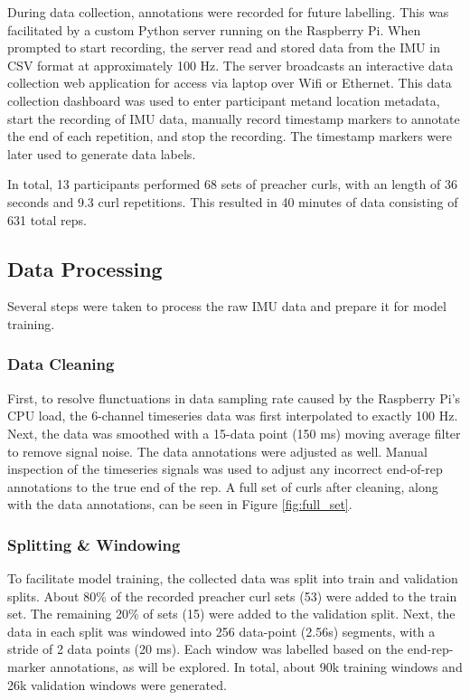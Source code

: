 \documentclass[conference]{IEEEtran}
\begin{document}
During data collection, annotations were recorded for future labelling. This was facilitated by a custom Python server running on the Raspberry Pi. When prompted to start recording, the server read and stored data from the IMU in CSV format at approximately 100 Hz. The server broadcasts an interactive data collection web application for access via laptop over Wifi or Ethernet. This data collection dashboard was used to enter participant metand location metadata, start the recording of IMU data, manually record timestamp markers to annotate the end of each repetition, and stop the recording. The timestamp markers were later used to generate data labels.

In total, 13 participants performed 68 sets of preacher curls, with an length of 36 seconds and 9.3 curl repetitions. This resulted in 40 minutes of data consisting of 631 total reps.

\subsection{Data Processing}
Several steps were taken to process the raw IMU data and prepare it for model training. 

\subsubsection{Data Cleaning}
First, to resolve flunctuations in data sampling rate caused by the Raspberry Pi's CPU load, the 6-channel timeseries data was first interpolated to exactly 100 Hz. Next, the data was smoothed with a 15-data point (150 ms) moving average filter to remove signal noise. The data annotations were adjusted as well. Manual inspection of the timeseries signals was used to adjust any incorrect end-of-rep annotations to the true end of the rep. A full set of curls after cleaning, along with the data annotations, can be seen in Figure \ref{fig:full_set}.

\subsubsection{Splitting \& Windowing}
To facilitate model training, the collected data was split into train and validation splits. About 80\% of the recorded preacher curl sets (53) were added to the train set. The remaining 20\% of sets (15) were added to the validation split. Next, the data in each split was windowed into 256 data-point (2.56s) segments, with a stride of 2 data points (20 ms). Each window was labelled based on the end-rep-marker annotations, as will be explored. In total, about 90k training windows and 26k validation windows were generated.
\end{document}
